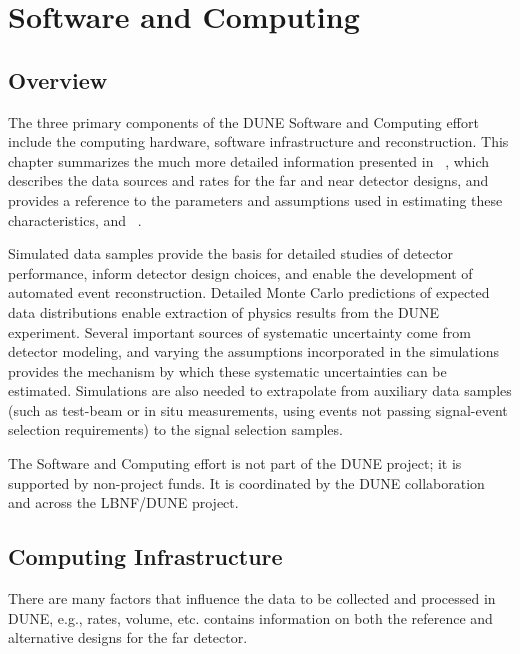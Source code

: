 \chapter{Software and Computing}
\label{ch:detectors-sc}

\section{Overview}

The three primary
components of the DUNE Software and Computing effort include the computing hardware, software
infrastructure and reconstruction. This chapter summarizes the much more detailed information presented in \anxrates~\cite{cdr-annex-rates}, which describes the data sources and rates for the far and near detector designs, and provides a reference to the parameters and assumptions used in estimating these characteristics, and \anxreco~\cite{cdr-annex-reco}. 

Simulated data samples provide the basis for detailed studies of detector performance, inform detector design choices, and enable the development of automated event reconstruction. Detailed Monte Carlo predictions of expected data distributions enable extraction of physics results from the DUNE experiment. Several important sources of systematic uncertainty come from detector modeling, and varying the assumptions incorporated in the simulations provides the mechanism by which these systematic uncertainties can be estimated. Simulations are also needed to extrapolate from auxiliary data samples (such as test-beam or in situ measurements, using events not passing signal-event selection requirements) to the signal selection samples. 

The Software and Computing effort is not part of the DUNE project; it 
is supported by non-project funds. It is coordinated by the
DUNE collaboration and across the LBNF/DUNE project. 

\section{Computing Infrastructure}
\label{sec:detectors-sc-infrastructure}

There are many factors that influence the
data to be collected and processed in DUNE, e.g., rates, volume, etc.  \anxrates
contains information on both the reference and alternative
designs for the far detector.

